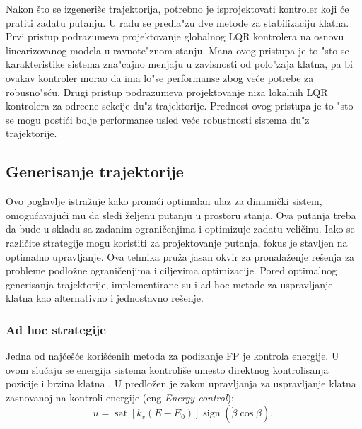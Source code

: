 \documentclass[a4paper,11pt]{article}
\theoremstyle{definition} \newtheorem{deff}{Definicija}[section]
\theoremstyle{definition} \newtheorem{prim}[deff]{Primer}
\theoremstyle{plain} \newtheorem{teor}[deff]{Teorema}
\begin{document}
	Nakon što se izgeneriše trajektorija, potrebno je isprojektovati kontroler koji će pratiti zadatu putanju. U radu \cite{inicijalna} se predla"zu dve metode za stabilizaciju klatna. Prvi pristup podrazumeva projektovanje globalnog LQR kontrolera na osnovu linearizovanog modela u ravnote"znom stanju. Mana ovog pristupa je to "sto se karakteristike sistema zna"cajno menjaju u zavisnosti od polo"zaja klatna, pa bi ovakav kontroler morao da ima lo"se performanse zbog ve\'ce potrebe za robusno"s\'cu. Drugi pristup podrazumeva projektovanje niza lokalnih LQR kontrolera za odre\dj ene sekcije du"z trajektorije. Prednost ovog pristupa je to "sto se mogu posti\'ci bolje performanse usled ve\'ce robustnosti sistema du"z trajektorije.  \\[16pt]
	

	\subsection{Generisanje trajektorije}\label{sec:gen_traj}
	
	Ovo poglavlje istražuje kako pronaći optimalan ulaz za dinamički sistem, omogućavajući mu da sledi željenu putanju u prostoru stanja. Ova putanja treba da bude u skladu sa zadanim ograničenjima i optimizuje zadatu veličinu. Iako se različite strategije mogu koristiti za projektovanje putanja, fokus je stavljen na optimalno upravljanje. Ova tehnika pruža jasan okvir za pronalaženje rešenja za probleme podložne ograničenjima i ciljevima optimizacije. Pored optimalnog generisanja trajektorije, implementirane su i ad hoc metode za uspravljanje klatna kao alternativno i jednostavno rešenje. 
	
	\subsubsection{Ad hoc strategije}
	\label{sec:andhoc}
	
	Jedna od najčešće korišćenih metoda za podizanje FP je kontrola energije. U ovom slučaju se energija sistema kontroliše umesto direktnog kontrolisanja pozicije i brzina klatna \cite{inicijalna}.
	U \cite{energy_c} predložen je zakon upravljanja za uspravljanje klatna zasnovanoj na kontroli energije (eng \textit{Energy control}): \\
	
	\begin{equation}
		u = \operatorname{sat}\left[k_v (E - E_0)\right] \operatorname{sign}( \dot{\beta} \cos \beta), 
		\label{eq:en_control}
	\end{equation} \\
	
\end{document}
